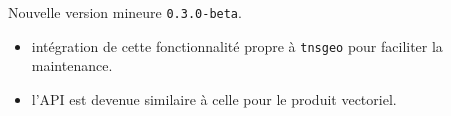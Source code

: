 Nouvelle version mineure \verb+0.3.0-beta+.

\begin{itemize}[itemsep=.5em]
    \item {} intégration de cette fonctionnalité propre à \verb#tnsgeo#  pour faciliter la maintenance.


    \item {} l'API est devenue similaire à celle pour le produit vectoriel.
\end{itemize}

\separation
